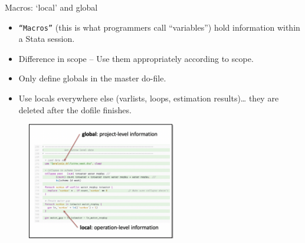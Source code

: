 \documentclass[aspectratio=169]{beamer}
\begin{document}
\begin{frame}[fragile]{Macros: `local’ and {global}}
\begin{multicols}{2}	
	
	\begin{itemize}[<default overlay specification>]
		\item<1> \texttt{“Macros”} (this is what programmers call “variables”) hold information within a Stata session.
		\item<1>  Difference in scope – Use them appropriately according to scope.
		\item<1>  Only define globals in the master do-file.
		\item<1>  Use locals everywhere else (varlists, loops, estimation results)… they are deleted after the dofile finishes. 
	\end{itemize}
	
	\begin{figure}
		\centering
		\includegraphics[width=65mm, right]{img/Syntax}
	\end{figure}
	
\end{multicols}
\end{frame}
\end{document}
